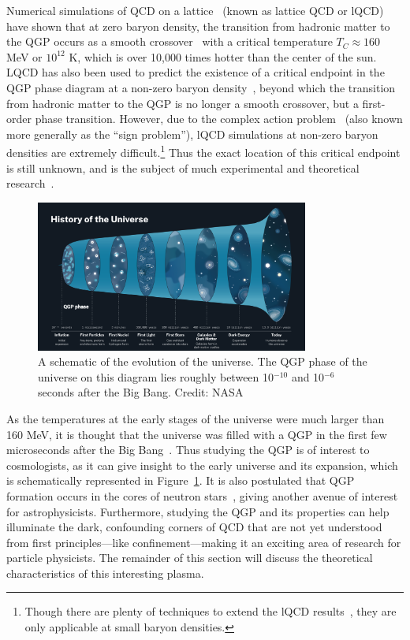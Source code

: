 Numerical simulations of QCD on a lattice~\cite{LatticeQCD1, LatticeQCD2} (known as lattice QCD or lQCD) have shown that at zero baryon density, the transition from hadronic matter to the QGP occurs as a smooth crossover~\cite{Crossover1, Crossover2} with a critical temperature $T_C \approx 160$ MeV or $10^{12}$ K, which is over 10,000 times hotter than the center of the sun. LQCD has also been used to predict the existence of a critical endpoint in the QGP phase diagram at a non-zero baryon density~\cite{CriticalEndpoint}, beyond which the transition from hadronic matter to the QGP is no longer a smooth crossover, but a first-order phase transition. However, due to the complex action problem~\cite{ComplexAction} (also known more generally as the ``sign problem''), lQCD simulations at non-zero baryon densities are extremely difficult.\footnote{Though there are plenty of techniques to extend the lQCD results~\cite{TaylorSeries, ComplexDensity}, they are only applicable at small baryon densities.} Thus the exact location of this critical endpoint is still unknown, and is the subject of much experimental and theoretical research~\cite{QGP3}.

\begin{figure}[t!]
    \centering
    \includegraphics[width=0.8\textwidth]{figures/introduction/qgp_history.png}
    \caption{A schematic of the evolution of the universe. The QGP phase of the universe on this diagram lies roughly between 10$^{-10}$ and 10$^{-6}$ seconds after the Big Bang. Credit: NASA}
    \label{fig:qgp_universe}
\end{figure}

As the temperatures at the early stages of the universe were much larger than 160 MeV, it is thought that the universe was filled with a QGP in the first few microseconds after the Big Bang~\cite{QGP3}. Thus studying the QGP is of interest to cosmologists, as it can give insight to the early universe and its expansion, which is schematically represented in Figure~\ref{fig:qgp_universe}. It is also postulated that QGP formation occurs in the cores of neutron stars~\cite{QGPNeutron}, giving another avenue of interest for astrophysicists. Furthermore, studying the QGP and its properties can help illuminate the dark, confounding corners of QCD that are not yet understood from first principles---like confinement---making it an exciting area of research for particle physicists. The remainder of this section will discuss the theoretical characteristics of this interesting plasma.



